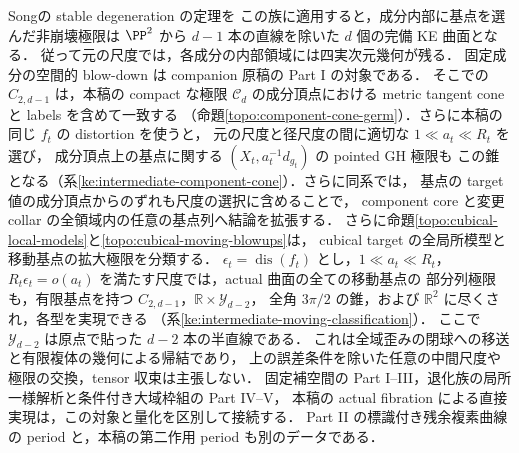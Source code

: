 Song\cite[Theorem~1.2]{SongNegativeKE}の stable degeneration の定理を
この族に適用すると，成分内部に基点を選んだ非崩壊極限は
$\PP^2$ から $d-1$ 本の直線を除いた $d$ 個の完備 KE 曲面となる．
従って元の尺度では，各成分の内部領域には四実次元幾何が残る．
固定成分の空間的 blow-down は companion 原稿の Part I
\cite[\texttt{cor:arrangement-cone}]{MultiscaleKECurrent}の対象である．
そこでの $C_{2,d-1}$ は，本稿の compact な極限 $\mathcal C_d$ の成分頂点における
metric tangent cone と labels を含めて一致する
（命題\ref{topo:component-cone-germ}）．さらに本稿の同じ $f_t$ の distortion を使うと，
元の尺度と径尺度の間に適切な $1\ll a_t\ll R_t$ を選び，
成分頂点上の基点に関する $(X_t,a_t^{-1}d_{g_t})$ の pointed GH 極限も
この錐となる（系\ref{ke:intermediate-component-cone}）．さらに同系では，
基点の target 値の成分頂点からのずれも尺度の選択に含めることで，
component core と変更 collar の全領域内の任意の基点列へ結論を拡張する．
さらに命題\ref{topo:cubical-local-models}と\ref{topo:cubical-moving-blowups}は，
cubical target の全局所模型と移動基点の拡大極限を分類する．
$\epsilon_t=\operatorname{dis}(f_t)$ とし，$1\ll a_t\ll R_t$，
$R_t\epsilon_t=o(a_t)$ を満たす尺度では，actual 曲面の全ての移動基点の
部分列極限も，有限基点を持つ $C_{2,d-1}$，$\mathbb R\times\mathcal Y_{d-2}$，
全角 $3\pi/2$ の錐，および $\mathbb R^2$ に尽くされ，各型を実現できる
（系\ref{ke:intermediate-moving-classification}）．
ここで $\mathcal Y_{d-2}$ は原点で貼った $d-2$ 本の半直線である．
これは全域歪みの閉球への移送と有限複体の幾何による帰結であり，
上の誤差条件を除いた任意の中間尺度や極限の交換，tensor 収束は主張しない．
固定補空間の Part I--III，退化族の局所一様解析と条件付き大域枠組の Part IV--V，
本稿の actual fibration による直接実現は，この対象と量化を区別して接続する．
Part II の標識付き残余複素曲線の period と，本稿の第二作用 period も別のデータである．

